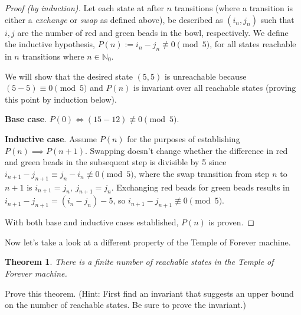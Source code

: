 \documentclass[a4paper]{article}
\newtheorem{theorem}{Theorem}[section]
\begin{document}
	\begin{proof}[Proof (by induction)]

		Let each state at after $n$ transitions (where a transition is
		either a \textit{exchange} or \textit{swap} as defined above),
		be described as $(i_{n}, j_{n})$ such that $i, j$ are the
		number of red and green beads in the bowl, respectively. We
		define the inductive hypothesis, $P(n) := i_{n} - j_{n}
		\not\equiv 0 \pmod{5}$, for all states reachable in $n$
		transitions where $n \in \mathbb{N}_0$.

		We will show that the desired state $(5, 5)$ is unreachable
		because $(5 - 5) \equiv 0 \pmod{5}$ and $P(n)$ is invariant
		over all reachable states (proving this point by induction below).

		\textbf{Base case}. $P(0) \iff (15 - 12) \not \equiv 0 \pmod{5}$.

		\textbf{Inductive case}. Assume $P(n)$ for the purposes of
		establishing $P(n) \implies P(n+1)$. Swapping doesn't change
		whether the difference in red and green beads in the subsequent
		step is divisible by 5 since $i_{n+1} - j_{n+1} \equiv j_{n} -
		i_{n} \not \equiv 0 \pmod{5}$, where the swap transition from
		step $n$ to $n+1$ is $i_{n+1} = j_{n},\ j_{n+1} = j_{n}$.
		Exchanging red beads for green beads results in $i_{n+1} -
		j_{n+1} = (i_{n} - j_{n}) - 5$, so $i_{n+1} - j_{n+1} \not
		\equiv 0 \pmod{5}$.

		With both base and inductive cases established, $P(n)$ is proven.
	\end{proof}

	Now let’s take a look at a different property of the Temple of Forever
	machine.

	\begin{theorem}
		There is a finite number of reachable states in the Temple of Forever machine.
	\end{theorem}

	Prove this theorem. (Hint: First find an invariant that suggests an
	upper bound on the number of reachable states. Be sure to prove the
	invariant.)
\end{document}
